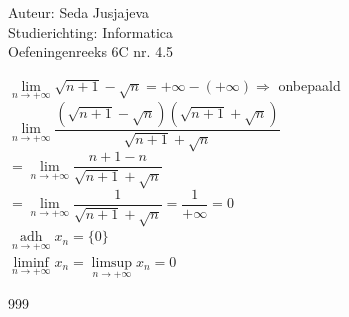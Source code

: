 \documentclass[a4paper]{article}
\newcommand{\limit}{\lim\limits}
\begin{document}
\noindent \large Auteur: Seda Jusjajeva\\
\noindent \large Studierichting: Informatica\\
\noindent \large Oefeningenreeks 6C nr. 4.5\\

\medskip

\normalsize


$\limit_{n \to +\infty} \sqrt{n + 1} - \sqrt{n} = +\infty - (+\infty) \Rightarrow$ onbepaald \\

$\limit_{n \to +\infty} \dfrac{\left(\sqrt{n + 1} - \sqrt{n}\right)\left(\sqrt{n + 1} + \sqrt{n}\right)}{\sqrt{n + 1} + \sqrt{n}}$ \\

$= \limit_{n \to +\infty} \dfrac{n + 1 - n}{\sqrt{n + 1} + \sqrt{n}}$ \\

$= \limit_{n \to +\infty} \dfrac{1}{\sqrt{n + 1} + \sqrt{n}} = \dfrac{1}{+\infty} = 0$ \\

$\operatorname*{adh}\limits_{n \to +\infty} x_n = \{0\}$ \\

$\liminf\limits_{n \to +\infty} x_n = \limsup\limits_{n \to +\infty} x_n = 0$ \\



\begin{thebibliography}{999}
\end{thebibliography}
\end{document}
